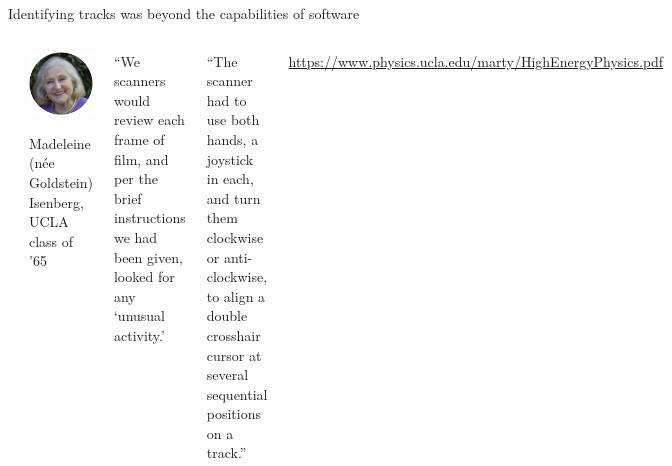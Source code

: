\documentclass[aspectratio=169]{beamer}
\begin{document}
\begin{frame}{Identifying tracks was beyond the capabilities of software}
\vspace{0.35 cm}
\begin{columns}
\includegraphics[width=\linewidth]{img/franckenstein-3.jpg}

\vspace{-0.5 cm}
\begin{center}
\includegraphics[width=0.5\linewidth]{img/madeleine-isenberg-SCANNER.png}

\scriptsize
Madeleine (n\'ee Goldstein) Isenberg, UCLA class of '65
\end{center}

\begin{minipage}{\linewidth}
\scriptsize
``We scanners would review each frame of film, and per the brief instructions we had been given, looked for any `unusual activity.'

\vspace{0.25 cm}
``The scanner had to use both hands, a joystick in each, and turn them clockwise or anti-clockwise, to align a double crosshair cursor at several sequential positions on a track.''

\vspace{0.25 cm}
\tiny
\textcolor{blue}{\url{https://www.physics.ucla.edu/marty/HighEnergyPhysics.pdf}}
\end{minipage}
\end{columns}
\end{frame}
\end{document}
